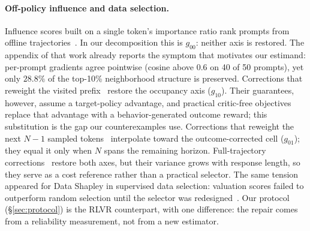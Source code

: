 \documentclass[11pt]{article}
\newcommand{\goo}{g_{00}}
\newcommand{\gto}{g_{10}}
\newcommand{\got}{g_{01}}
\begin{document}
\paragraph{Off-policy influence and data selection.}
Influence scores built on a single token's importance ratio rank prompts
from offline trajectories~\citep{cropi}. In our decomposition this is
$\goo$: neither axis is restored. The appendix of that work already reports
the symptom that motivates our estimand: per-prompt gradients agree pointwise
(cosine above $0.6$ on 40 of 50 prompts), yet only $28.8\%$ of the top-10\%
neighborhood structure is preserved. Corrections that reweight the visited
prefix~\citep{stepback,cumulative} restore the occupancy axis ($\gto$).
Their guarantees, however, assume a target-policy advantage, and practical
critic-free objectives replace that advantage with a behavior-generated
outcome reward; this substitution is the gap our counterexamples use.
Corrections that reweight the next $N-1$ sampled tokens~\citep{multistep}
interpolate toward the outcome-corrected cell ($\got$); they equal it only
when $N$ spans the remaining horizon. Full-trajectory
corrections~\citep{ticgrpo} restore both
axes, but their variance grows with response length, so they serve as a cost
reference rather than a practical selector. The same tension appeared for
Data Shapley in supervised data selection: valuation scores failed to
outperform random selection until the selector was
redesigned~\citep{rethinkshapley,nash}. Our protocol (\S\ref{sec:protocol})
is the RLVR counterpart, with one difference: the repair comes from a
reliability measurement, not from a new estimator.
\end{document}
